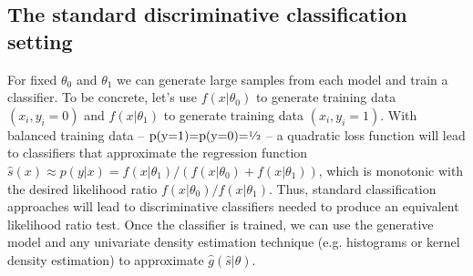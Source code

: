 \documentclass[11pt, oneside]{article}   	%
\begin{document}
\subsection{The standard discriminative classification setting} For fixed $\theta_0$ and $\theta_1$ we can generate 
large samples from each model and train a classifier. To be concrete, let's use $f(x|\theta_0)$ to generate training 
data $(x_i,  y_i=0)$ and $f(x|\theta_1)$ to generate training data $(x_i , y_i=1)$. With balanced training data  -- $\mbox{p(y=1)=p(y=0)=\sfrac{1}{2}}$ -- a quadratic loss function will lead to classifiers that approximate the regression function  $\hat{s}(x) \approx p(y|x) = f(x|\theta_1)/(f(x|\theta_0)+f(x|\theta_1))$, which is  monotonic with the desired likelihood ratio $f(x|\theta_0)/f(x|\theta_1)$. Thus, standard classification approaches will lead to discriminative classifiers needed to produce an equivalent likelihood ratio test.  Once the classifier is trained, we can use the generative model and any univariate density estimation technique (e.g. histograms or kernel density estimation) to approximate $\hat{g}(\hat{s}|\theta)$.


%
%

\end{document}
